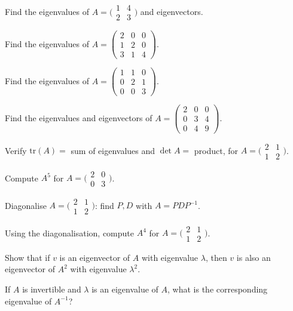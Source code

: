 \begin{problems}
  \item Find the eigenvalues of $A = \bigl(\begin{smallmatrix} 1 & 4 \\ 2 & 3 \end{smallmatrix}\bigr)$ and eigenvectors.
  \item Find the eigenvalues of $A = \begin{pmatrix} 2 & 0 & 0 \\ 1 & 2 & 0 \\ 3 & 1 & 4 \end{pmatrix}$.
  \item Find the eigenvalues of $A = \begin{pmatrix} 1 & 1 & 0 \\ 0 & 2 & 1 \\ 0 & 0 & 3 \end{pmatrix}$.
  \item Find the eigenvalues and eigenvectors of $A = \begin{pmatrix} 2 & 0 & 0 \\ 0 & 3 & 4 \\ 0 & 4 & 9 \end{pmatrix}$.
  \item Verify $\mathrm{tr}(A) = $ sum of eigenvalues and $\det A = $ product, for $A = \bigl(\begin{smallmatrix} 2 & 1 \\ 1 & 2 \end{smallmatrix}\bigr)$.
  \item Compute $A^{5}$ for $A = \bigl(\begin{smallmatrix} 2 & 0 \\ 0 & 3 \end{smallmatrix}\bigr)$.
  \item Diagonalise $A = \bigl(\begin{smallmatrix} 2 & 1 \\ 1 & 2 \end{smallmatrix}\bigr)$: find $P, D$ with $A = P D P^{-1}$.
  \item Using the diagonalisation, compute $A^{4}$ for $A = \bigl(\begin{smallmatrix} 2 & 1 \\ 1 & 2 \end{smallmatrix}\bigr)$.
  \item Show that if $v$ is an eigenvector of $A$ with eigenvalue $\lambda$, then $v$ is also an eigenvector of $A^{2}$ with eigenvalue $\lambda^{2}$.
  \item If $A$ is invertible and $\lambda$ is an eigenvalue of $A$, what is the corresponding eigenvalue of $A^{-1}$?

\end{problems}
